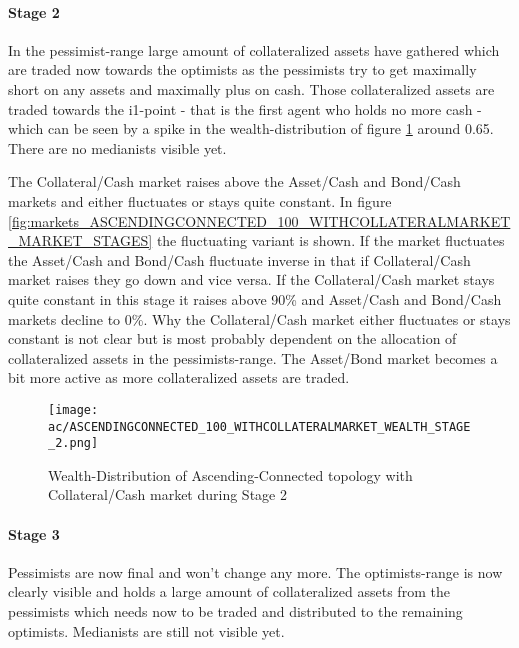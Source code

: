 \documentclass[Bachelorarbeit.tex]{subfiles}
\begin{document}
\paragraph{Stage 2}
In the pessimist-range large amount of collateralized assets have gathered which are traded now towards the optimists as the pessimists try to get maximally short on any assets and maximally plus on cash. Those collateralized assets are traded towards the i1-point - that is the first agent who holds no more cash - which can be seen by a spike in the wealth-distribution of figure \ref{fig:wealth_ASCENDINGCONNECTED_100_WITHCOLLATERALMARKET_WEALTH_STAGE_2} around 0.65.
There are no medianists visible yet.

\medskip

The Collateral/Cash market raises above the Asset/Cash and Bond/Cash markets and either fluctuates or stays quite constant. In figure \ref{fig:markets_ASCENDINGCONNECTED_100_WITHCOLLATERALMARKET_MARKET_STAGES} the fluctuating variant is shown. If the market fluctuates the Asset/Cash and Bond/Cash fluctuate inverse in that if Collateral/Cash market raises they go down and vice versa. If the Collateral/Cash market stays quite constant in this stage it raises above 90\% and Asset/Cash and Bond/Cash markets decline to 0\%. Why the Collateral/Cash market either fluctuates or stays constant is not clear but is most probably dependent on the allocation of collateralized assets in the pessimists-range. The Asset/Bond market becomes a bit more active as more collateralized assets are traded.

\begin{figure}[H]
	\centering
  \texttt{[image: ac/ASCENDINGCONNECTED\_100\_WITHCOLLATERALMARKET\_WEALTH\_STAGE\_2.png]}
  	\caption{Wealth-Distribution of Ascending-Connected topology with Collateral/Cash market during Stage 2}
	\label{fig:wealth_ASCENDINGCONNECTED_100_WITHCOLLATERALMARKET_WEALTH_STAGE_2}
\end{figure}

\paragraph{Stage 3}
Pessimists are now final and won't change any more. The optimists-range is now clearly visible and holds a large amount of collateralized assets from the pessimists which needs now to be traded and distributed to the remaining optimists. Medianists are still not visible yet.

\medskip
\end{document}
